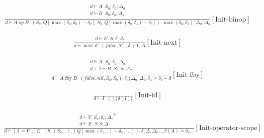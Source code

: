 \documentclass{scrartcl}
\DeclareMathOperator{\fby}{fby}
\DeclareMathOperator{\nextop}{next}
\DeclareMathOperator{\initrel}{\overset{init}{\Rightarrow}}
\begin{document}
    \begin{align*}
    \frac{
        \begin{matrix}
        d \vdash A \initrel S_a; \delta_a; \Delta_a \\
        d \vdash B \initrel S_b; \delta_b; \Delta_b \\
        \end{matrix}
    }{
        d \vdash A \; op \; B \initrel (S_a, Q[\max(\delta_a, \delta_b) - \delta_a], S_b, Q[\max(\delta_a, \delta_b) - \delta_b]); \max(\delta_a, \delta_b); \Delta_a, \Delta_b
    }[\text{Init-binop}]
    \end{align*}
    
    \begin{align*}
    \frac{
        \begin{matrix}
        d \vdash E \initrel S; \delta; \Delta
        \end{matrix}
    }{
        d \vdash \nextop E \initrel (false, S); \delta+1; \Delta
    }[\text{Init-next}]
    \end{align*}
    
    \begin{align*}
    \frac{
        \begin{matrix}
        d \vdash A \initrel S_a; \delta_a; \Delta_a \\
        d+1 \vdash B \initrel S_b; \delta_b; \Delta_b \\
        \end{matrix}
    }{
        d \vdash A \fby B \initrel (false, nil, S_a, S_b); \delta_a; \Delta_a, \Delta_b, \delta_a \geq \delta_b - d
    }[\text{Init-fby}]
    \end{align*}
    
    \begin{align*}
    \frac{}{
        d \vdash I \initrel (); \delta(I);
    }[\text{Init-id}]
    \end{align*}
    
    \begin{align*}
    \frac{
        \begin{matrix}
        \overline{d \vdash V \initrel S_v; \delta_v; \Delta_v}^{V...} \\
        d \vdash E \initrel S; \delta; \Delta
        \end{matrix}
    }{
        d \vdash [A=V...]E \initrel (S, (S_v...), (Q[\max(\delta_v...) - \delta_v]...)); \delta; \Delta, \Delta_v..., \delta(A)=\delta_v...
    }[\text{Init-operator-scope}]
    \end{align*}
    
\end{document}
